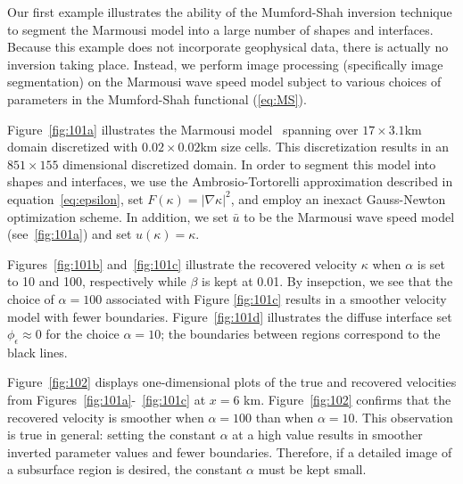 \documentclass[manuscript,revised]{geophysics}
\begin{document}
Our first example illustrates the ability of the Mumford-Shah inversion technique to segment the Marmousi model into a large number of shapes and interfaces.  Because this example does not incorporate geophysical data, there is actually no inversion taking place.  Instead, we perform image processing (specifically image segmentation) on the Marmousi wave speed model subject to various choices of parameters in the Mumford-Shah functional  (\ref{eq:MS}).

Figure~\ref{fig:101a} illustrates the Marmousi model~\cite[]{Marmousi2} spanning over $17\times3.1$km domain discretized with $0.02\times0.02$km size cells. This discretization results in an $851\times155$ dimensional discretized domain. In order to segment this model into shapes and interfaces, we use the Ambrosio-Tortorelli approximation described in equation~\ref{eq:epsilon}, set $F(\kappa)=\left\vert \nabla \kappa \right\vert^2$, and employ an inexact Gauss-Newton optimization scheme.  In addition, we set $\bar{u}$ to be the Marmousi wave speed model (see~\ref{fig:101a}) and set $u(\kappa)=\kappa$. 

Figures~\ref{fig:101b} and~\ref{fig:101c} illustrate the recovered velocity $\kappa$ when $\alpha$ is set to 10 and 100, respectively while $\beta$ is kept at 0.01. By insepction, we see that the choice of $\alpha = 100$ associated with Figure \ref{fig:101c} results in a smoother velocity model with fewer boundaries. Figure~\ref{fig:101d} illustrates the diffuse interface set $\phi_\epsilon \approx 0$ for the choice $\alpha = 10$; the boundaries between regions correspond to the black lines.

Figure~\ref{fig:102} displays one-dimensional plots of the true and recovered velocities from Figures~\ref{fig:101a}-~\ref{fig:101c} at $x = 6$ km. Figure~\ref{fig:102} confirms that the recovered velocity is smoother when $\alpha = 100$ than when $\alpha = 10$. This observation is true in general: setting the constant $\alpha$ at a high value results in smoother inverted parameter values and fewer boundaries. Therefore, if a detailed image of a subsurface region is desired, the constant $\alpha$ must be kept small. 
\end{document}
